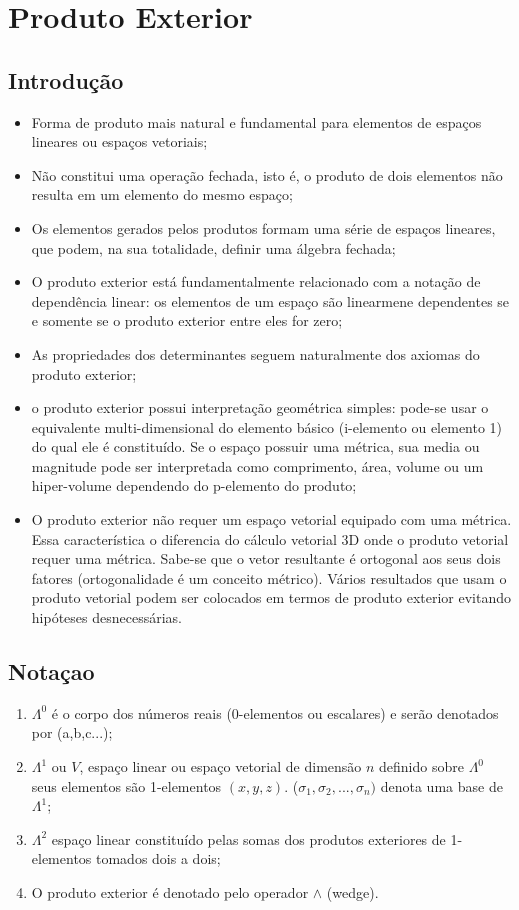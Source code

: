 \section{Produto Exterior}
\subsection{Introdução}
\begin{itemize}
 \item Forma de produto mais natural e fundamental para elementos de espaços lineares ou espaços vetoriais;
 \item Não constitui uma operação fechada, isto é, o produto de dois elementos não resulta em um elemento do mesmo espaço;
 \item Os elementos gerados pelos produtos formam uma série de espaços lineares, que podem, na sua totalidade, definir uma álgebra fechada;
 \item O produto exterior está fundamentalmente relacionado com a notação de dependência linear: os elementos de um espaço são linearmene dependentes se e somente se o produto exterior entre eles for zero;
 \item As propriedades dos determinantes seguem naturalmente dos axiomas do produto exterior;
 \item o produto exterior possui interpretação geométrica simples: pode-se usar o equivalente multi-dimensional do elemento básico (i-elemento ou elemento 1) do qual ele é constituído. Se o espaço possuir uma métrica, sua media ou magnitude pode ser interpretada como comprimento, área, volume ou um hiper-volume dependendo do p-elemento do produto;
 \item O produto exterior não requer um espaço vetorial equipado com uma métrica. Essa característica o diferencia do cálculo vetorial 3D onde o produto vetorial requer uma métrica. Sabe-se que o vetor resultante é ortogonal aos seus dois fatores (ortogonalidade é um conceito métrico). Vários resultados que usam o produto vetorial podem ser colocados em termos de produto exterior evitando hipóteses desnecessárias.
\end{itemize}

\subsection{Notaçao}
\begin{enumerate}
 \item $\Lambda^0$ é o corpo dos números reais (0-elementos ou escalares) e serão denotados por (a,b,c...);
 \item $\Lambda^1$ ou $V$, espaço linear ou espaço vetorial de dimensão $n$ definido sobre $\Lambda^0$ seus elementos são 1-elementos $(x,y,z)$. ($\sigma_1, \sigma_2, ..., \sigma_n)$ denota uma base de $\Lambda^1$;
 \item $\Lambda^2$ espaço linear constituído pelas somas dos produtos exteriores de 1-elementos tomados dois a dois;
 \item O produto exterior é denotado pelo operador $\wedge$ (wedge).
\end{enumerate}


